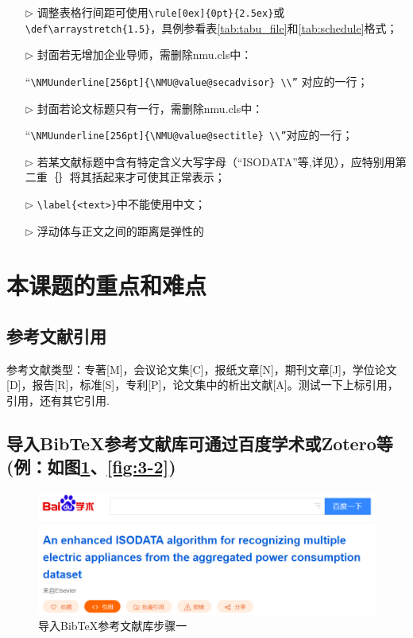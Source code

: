 \begin{framedbox}
\begin{itemize}
	\item[$\triangleright$] 调整表格行间距可使用\verb|\rule[0ex]{0pt}{2.5ex}|或\verb|\def\arraystretch{1.5}|，具例参看表\ref{tab:tabu_file}和\ref{tab:schedule}格式；
	\item[$\triangleright$] 封面若无增加企业导师，需删除nmu.cls中：
	
	“\verb|\NMUunderline[256pt]{\NMU@value@secadvisor} \\”| 对应的一行；
	\item[$\triangleright$] 封面若论文标题只有一行，需删除nmu.cls中：
	
	“\verb|\NMUunderline[256pt]{\NMU@value@sectitle} \\”|对应的一行；
	\item[$\triangleright$] 若某文献标题中含有特定含义大写字母（“ISODATA”等,详见\cite{Li2017An}），应特别用第二重｛｝将其括起来才可使其正常表示；
	\item[$\triangleright$] \verb|\label{<text>}|中不能使用中文；
	\item[$\triangleright$] 浮动体与正文之间的距离是弹性的
\end{itemize}

\newpage
\section{本课题的重点和难点} 
\NMUtableline

\subsection{参考文献引用}

参考文献类型：专著[M]，会议论文集[C]，报纸文章[N]，期刊文章[J]，学位论文[D]，报告[R]，标准[S]，专利[P]，论文集中的析出文献[A]。测试一下上标引用，引用\cite{Le2016Multiple,Kaya2015,tf2017}，还有其它引用.


\subsection{导入BibTeX参考文献库可通过百度学术或Zotero等(例：如图\ref{fig:3-1}、\ref{fig:3-2})}



\begin{figure}[tbh!]
	\centering
	\includegraphics[width=0.6\linewidth]{figures/sample/3-1}
	\caption{导入BibTeX参考文献库步骤一}
	\label{fig:3-1}
\end{figure}


\end{framedbox}
